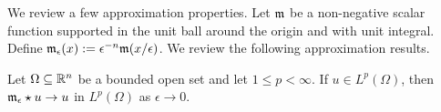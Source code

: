 \documentclass[10pt,letterpaper]{article}
\begin{document}
We review a few approximation properties. 
Let ${\mathfrak m}$ be a non-negative scalar function supported in the unit ball around the origin and with unit integral.
Define ${\mathfrak m}_{\epsilon}(x) := \epsilon^{-n} {\mathfrak m}(x/\epsilon)$. We review the following approximation results.

\begin{lemma}
    Let $\Omega \subseteq {\mathbb R}^{n}$ be a bounded open set and let $1 \leq p < \infty$. 
    If $u \in L^{p}(\Omega)$, then ${\mathfrak m}_{\epsilon} \star u \rightarrow u$ in $L^{p}(\Omega)$ as $\epsilon \rightarrow 0$.
\end{lemma}

\end{document}
